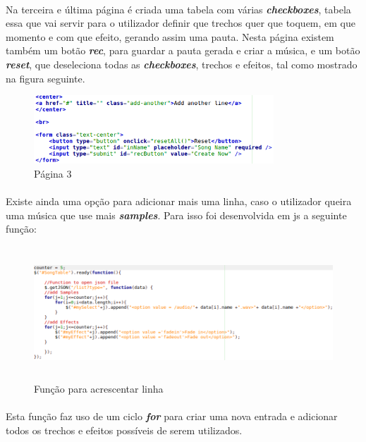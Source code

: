 \documentclass[a4paper]{report}
\begin{document}
\paragraph{}Na terceira e última página é criada uma tabela com várias \textit{\textbf{checkboxes}}, tabela essa que vai servir para o utilizador definir que trechos quer que toquem, em que momento e com que efeito, gerando assim uma pauta. Nesta página existem também um botão \textit{\textbf{rec}}, para guardar a pauta gerada e criar a música, e um botão \textit{\textbf{reset}}, que deseleciona todas as \textit{\textbf{checkboxes}}, trechos e efeitos, tal como mostrado na figura seguinte.
\begin{figure}[H]
\center
\includegraphics[width=9cm] {imagens/page3_2}
\caption{Página 3}
\end{figure}

\newpage

\paragraph{}Existe ainda uma opção para adicionar mais uma linha, caso o utilizador queira uma música que use mais \textit{\textbf{samples}}. Para isso foi desenvolvida em \ac{js} a seguinte função:
\begin{figure}[H]
\center
\includegraphics[height=5cm] {imagens/page3_function}
\caption{Função para acrescentar linha}
\end{figure}
\paragraph{}Esta função faz uso de um ciclo \textit{\textbf{for}} para criar uma nova entrada e adicionar todos os trechos e efeitos possíveis de serem utilizados.
\end{document}
